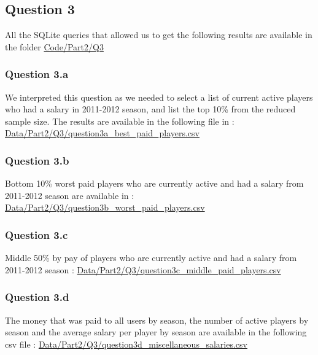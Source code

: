 
\subsection{Question 3}
\label{subsec:413}
All the SQLite queries that allowed us to get the following results are available in the folder \url{Code/Part2/Q3}

\subsubsection{Question 3.a}
\label{subsubsec:413a}
We interpreted this question as we needed to select a list of current active players who had a salary in 2011-2012 season, and list the top 10\% from the reduced sample size. The results are available in the following file in : \url{Data/Part2/Q3/question3a_best_paid_players.csv}

\subsubsection{Question 3.b}
\label{subsubsec:413b}
Bottom 10\% worst paid players who are currently active and had a salary from 2011-2012 season are available in : \url{Data/Part2/Q3/question3b_worst_paid_players.csv}

\subsubsection{Question 3.c}
\label{subsubsec:413c}
Middle 50\% by pay of players who are currently active and had a salary from 2011-2012 season : \url{Data/Part2/Q3/question3c_middle_paid_players.csv}

\subsubsection{Question 3.d}
\label{subsubsec:413d}
The money that was paid to all users by season, the number of active players by season and the average salary per player by season are available in the following csv file : \url{Data/Part2/Q3/question3d_miscellaneous_salaries.csv}
